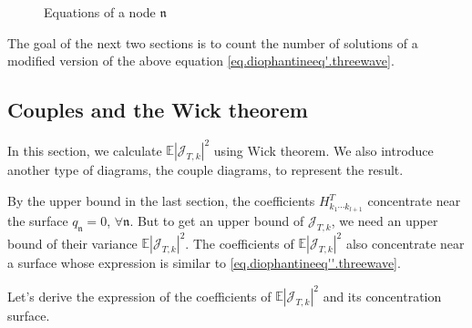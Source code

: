 \begin{figure}[H]
    \centering
        \caption{Equations of a node $\mathfrak{n}$}
        \label{fig.equations}
    \end{figure}
    

The goal of the next two sections is to count the number of solutions of a modified version of the above equation \eqref{eq.diophantineeq'.threewave}. 

\subsection{Couples and the Wick theorem}\label{sec.coupwick} In this section, we calculate $\mathbb{E}|\mathcal{J}_{T,k}|^2$ using Wick theorem. We also introduce another type of diagrams, the couple diagrams, to represent the result.

By the upper bound in the last section, the coefficients $H^T_{k_1\cdots k_{l+1}}$ concentrate near the surface $q_{\mathfrak{n}}=0$, $\forall \mathfrak{n}$. But to get an upper bound of $\mathcal{J}_{T,k}$, we need an upper bound of their variance $\mathbb{E}|\mathcal{J}_{T,k}|^2$. The coefficients of $\mathbb{E}|\mathcal{J}_{T,k}|^2$ also concentrate near a surface whose expression is similar to \eqref{eq.diophantineeq''.threewave}. 

Let's derive the expression of the coefficients of $\mathbb{E}|\mathcal{J}_{T,k}|^2$ and its concentration surface.

